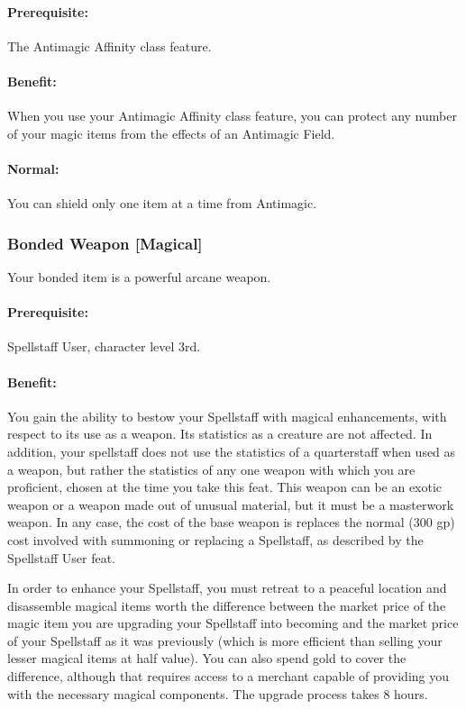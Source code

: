 \paragraph{Prerequisite:} The Antimagic Affinity class feature.
\paragraph{Benefit:} When you use your Antimagic Affinity class feature, you can protect any number of your magic items from the effects of an Antimagic Field.
\paragraph{Normal:} You can shield only one item at a time from Antimagic.

\subsubsection[Bonded Weapon]{Bonded Weapon [Magical]}
\label{Feat:BondedWeapon}
Your bonded item is a powerful arcane weapon.
 
\paragraph{Prerequisite:} Spellstaff User, character level 3rd.
 
\paragraph{Benefit:} You gain the ability to bestow your Spellstaff with magical enhancements, with respect to its use as a weapon. Its statistics as a creature are not affected. 
In addition, your spellstaff does not use the statistics of a quarterstaff when used as a weapon, but rather the statistics of any one weapon with which you are proficient, chosen at the time you take this feat.
This weapon can be an exotic weapon or a weapon made out of unusual material, but it must be a masterwork weapon. 
In any case, the cost of the base weapon is replaces the normal (300 gp) cost involved with summoning or replacing a Spellstaff, as described by the Spellstaff User feat.

In order to enhance your Spellstaff, you must retreat to a peaceful location and disassemble magical items worth the difference between the market price of the magic item you are upgrading your Spellstaff into becoming and the market price of your Spellstaff as it was previously (which is more efficient than selling your lesser magical items at half value).
You can also spend gold to cover the difference, although that requires access to a merchant capable of providing you with the necessary magical components.
The upgrade process takes 8 hours.%

